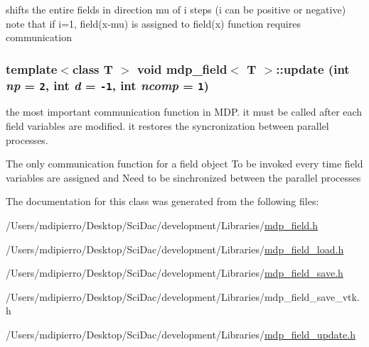 shifts the entire fields in direction mu of i steps (i can be positive or negative) note that if i=1, field(x-mu) is assigned to field(x) function requires communication \hypertarget{classmdp__field_72b973da706841ea58dc728345d36795}{
\subsubsection[{update}]{\setlength{\rightskip}{0pt plus 5cm}template$<$class T $>$ void {\bf mdp\_\-field}$<$ T $>$::update (int {\em np} = {\tt 2}, \/  int {\em d} = {\tt -1}, \/  int {\em ncomp} = {\tt 1})}}
\label{classmdp__field_72b973da706841ea58dc728345d36795}


the most important communication function in MDP. it must be called after each field variables are modified. it restores the syncronization between parallel processes.

The only communication function for a field object To be invoked every time field variables are assigned and Need to be sinchronized between the parallel processes 

The documentation for this class was generated from the following files:\begin{CompactItemize}
\item 
/Users/mdipierro/Desktop/SciDac/development/Libraries/\hyperlink{mdp__field_8h}{mdp\_\-field.h}\item 
/Users/mdipierro/Desktop/SciDac/development/Libraries/\hyperlink{mdp__field__load_8h}{mdp\_\-field\_\-load.h}\item 
/Users/mdipierro/Desktop/SciDac/development/Libraries/\hyperlink{mdp__field__save_8h}{mdp\_\-field\_\-save.h}\item 
/Users/mdipierro/Desktop/SciDac/development/Libraries/mdp\_\-field\_\-save\_\-vtk.h\item 
/Users/mdipierro/Desktop/SciDac/development/Libraries/\hyperlink{mdp__field__update_8h}{mdp\_\-field\_\-update.h}\end{CompactItemize}
